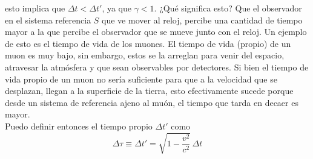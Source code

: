 esto implica que $\Delta t < \Delta t'$, ya que $\gamma < 1$. ¿Qué significa esto? Que el observador en el sistema referencia $S$ que ve mover al reloj, percibe una cantidad de tiempo mayor a la que percibe el observador que se mueve junto con el reloj. Un ejemplo de esto es el tiempo de vida de los muones. El tiempo de vida (propio) de un muon es muy bajo, sin embargo, estos se la arreglan para venir del espacio, atravesar la atmósfera y que sean observables por detectores. Si bien el tiempo de vida propio de un muon no sería suficiente para que a la velocidad que se desplazan, llegan a la superficie de la tierra, esto efectivamente sucede porque desde un sistema de referencia ajeno al muón, el tiempo que tarda en decaer es mayor.\\
\indent Puedo definir entonces el tiempo propio $\Delta t'$ como
\begin{equation}
    \Delta \tau \equiv
    \Delta t' =
    \sqrt{1 - \frac{v^{2}}{c^{2}}}\,\Delta t
        \label{ec:TiempoPropio}
\end{equation}




